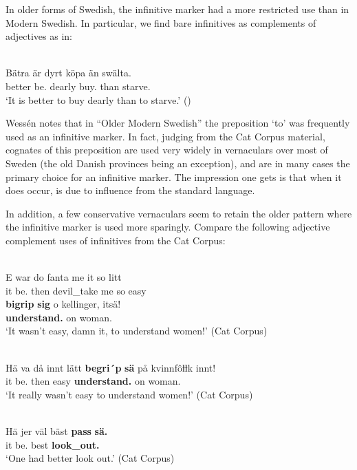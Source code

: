 In older forms of Swedish, the infinitive marker had a more restricted use than in Modern Swedish. In particular, we find bare infinitives as complements of adjectives as in:

\ea\label{}
\\
\gll Bätra  är  dyrt  köpa  än  swälta.  \\
better  be.{\prs}  dearly  buy.{\inf}  than  starve.{\inf}  \\
\glt ‘It is better to buy dearly than to starve.’ (\citet[138]{Wessén1956})
\z

Wessén notes that in “Older Modern Swedish” the preposition  ‘to’ was frequently used as an infinitive marker. In fact, judging from the Cat Corpus material, cognates of this preposition are used very widely in vernaculars over most of Sweden (the old Danish provinces being an exception), and are in many cases the primary choice for an infinitive marker. The impression one gets is that when it does occur, is due to influence from the standard language. 

In addition, a few conservative vernaculars seem to retain the older pattern where the infinitive marker is used more sparingly. Compare the following adjective complement uses of infinitives from the Cat Corpus:

\ea\label{}
\\
\gll E  war  do  fanta  me  it  so  litt\\
it  be.{\pst}  then  devil\_take  me  {\neg}  so  easy\\
\gll \textbf{bigrip} \textbf{sig} o  kellinger,  itsä!\\
\textbf{understand.{\inf}} \textbf{{}} on  woman.{\pl}  {\neg}\\
\glt  ‘It wasn’t easy, damn it, to understand women!’ (Cat Corpus)
\z

\ea\label{}
\\
\gll Hä  va  då  innt  lätt  \textbf{begri´p} \textbf{sä} på  kvinnfôƚƚk  innt!\\
it  be.{\pst}  then  {\neg}  easy  \textbf{understand.{\inf}} \textbf{{}} on  woman.{\pl}  {\neg}\\
\glt ‘It really wasn’t easy to understand women!’ (Cat Corpus)
\z

\ea\label{}
\\
\gll Hä  jer  väl  bäst  \textbf{pass} \textbf{sä.}\\
it  be.{\prs}  {\prag}  best  \textbf{look\_out.{\inf}} \textbf{{}}\\
\glt ‘One had better look out.’ (Cat Corpus)
\z

